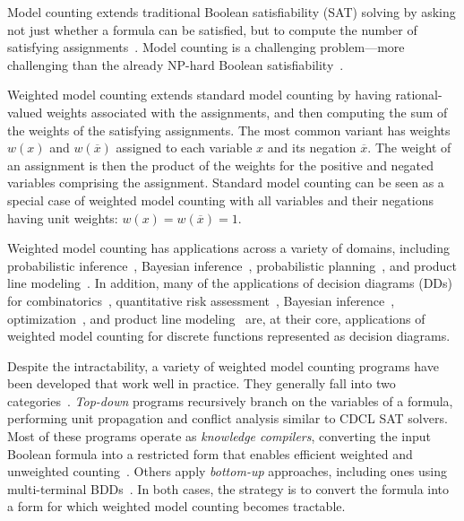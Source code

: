 \documentclass{easychair}
\newcommand{\obar}[1]{\overline{#1}}
\begin{document}
Model counting extends traditional Boolean satisfiability (SAT) solving by
asking not just whether a formula can be satisfied, but to compute the
number of satisfying assignments~\cite{gomes:hs:2009}.  Model counting is a challenging
problem---more challenging than the already NP-hard Boolean
satisfiability~\cite{valiant:siam:1979}.

Weighted model counting extends standard model counting by having
rational-valued weights associated with the assignments, and then
computing the sum of the weights of the satisfying assignments.  The
most common variant has weights $w(x)$ and $w(\obar{x})$
assigned to each variable $x$ and its negation $\obar{x}$.  The
weight of an assignment is then the product of the weights for
the positive and negated variables comprising the assignment.
Standard model counting can be seen as a special case of weighted model
counting with all variables and their negations having unit weights: $w(x) = w(\obar{x}) = 1$.

Weighted model counting has applications across a variety of domains,
including probabilistic inference~\cite{chavira:ai:2008,dubray:cp:2024}, Bayesian
inference~\cite{sang:aaai:2005}, probabilistic
planning~\cite{domshlak:jair:2007}, and product line modeling~\cite{sundermann:eme:2023,sundermann:tsem:2024}.  In addition, many of the
applications of decision diagrams (DDs) for
combinatorics~\cite{knuth:bdd:2011}, quantitative risk
assessment~\cite{andrews:ieeetr:2000,groen:ress:2006,hardy:ieeer:2007,xing:wiley:2015,xing:amm:2025},
Bayesian inference~\cite{minato:ijcai:2007},
optimization~\cite{bergman:book:2016}, and
product line modeling~\cite{andersen:jair:2010,benavides:is:2010} are, at their core, applications of
weighted model counting for discrete functions represented as decision diagrams.

Despite the intractability, a variety of weighted model counting
programs have been developed that work well in practice.  They
generally fall into two categories~\cite{shaw:kr:2024}. \emph{Top-down} programs
recursively branch on the variables of a formula, performing unit
propagation and conflict analysis similar to CDCL SAT solvers.  Most
of these programs operate as \emph{knowledge compilers}, converting
the input Boolean formula into a restricted form that enables efficient
weighted and unweighted counting~\cite{darwiche:aaai:2002,darwiche:ecai:2004,lagniez:ijcai:2017,muise:cai:2012,oztok:cp:2014,sharma:ijcai:2019}.
Others apply \emph{bottom-up} approaches, including ones using
multi-terminal BDDs~\cite{dudek:aaai:2020,dudek:sat:2021}.  In both
cases, the strategy is to convert the formula into a form for which
weighted model counting becomes tractable.
\end{document}
